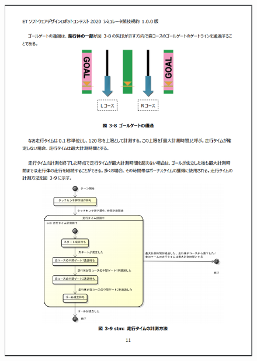 \documentclass[uplatex, report, a4j, 10pt]{jsbook}
\begin{document}
\begin{figure}[tp]
    \begin{center}
    \includegraphics[width=\hsize]{specification/ET_8.eps}
    \end{center}
\end{figure}
\end{document}
